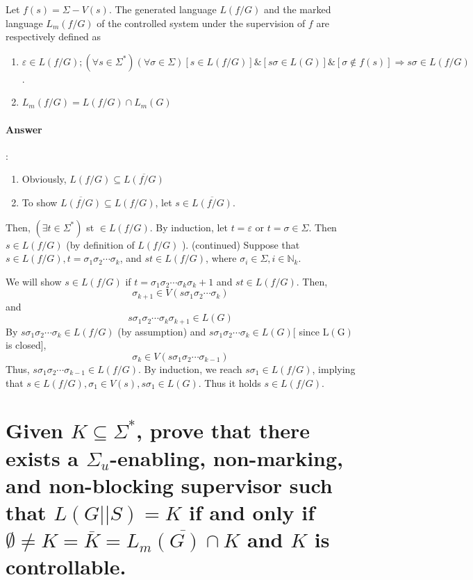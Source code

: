 \documentclass{article}
\begin{document}
Let $f(s)=\Sigma-V(s)$. The generated language $L(f / G)$ and the marked language $L_m(f / G)$ of the controlled system under the supervision of $f$ are respectively defined as
\begin{enumerate}
  \item $\varepsilon \in L(f / G) ;\left(\forall s \in \Sigma^*\right)(\forall \sigma \in \Sigma)[s \in L(f / G)] \&[s \sigma \in L(G)] \&[\sigma \notin f(s)] \Rightarrow s \sigma \in L(f / G)$.
  \item $L_m(f / G)=L(f / G) \cap L_m(G)$
\end{enumerate}

\paragraph{Answer}:
\begin{enumerate}
  \item Obviously, $L(f/ G) \subseteq \overline{L(f/ G)}$
  \item To show $\overline{L(f/ G)} \subseteq L(f/ G)$, let $s \in \overline{L(f/ G)}$.
\end{enumerate}
Then, $\left(\exists t \in \Sigma^*\right)$ st $\in L(f/ G)$.
By induction, let $t=\varepsilon$ or $t=\sigma \in \Sigma$.
Then $s \in L(f/ G)$ (by definition of $L(f/ G)$ ).
(continued) Suppose that $s \in L(f/ G), t=\sigma_1 \sigma_2 \cdots \sigma_k$, and $s t \in L(f/ G)$, where $\sigma_i \in \Sigma, i \in \mathbb{N}_k$.

We will show $s \in L(f/ G)$ if $t=\sigma_1 \sigma_2 \cdots \sigma_k \sigma_k+1$ and $s t \in L(f/ G)$. Then,
$$
\sigma_{k+1} \in V\left(s \sigma_1 \sigma_2 \cdots \sigma_k\right)
$$
and
$$
s \sigma_1 \sigma_2 \cdots \sigma_k \sigma_{k+1} \in L(G)
$$
By $s \sigma_1 \sigma_2 \cdots \sigma_k \in L(f/ G)$ (by assumption) and $s \sigma_1 \sigma_2 \cdots \sigma_k \in L(G)[$ since $\mathrm{L}(\mathrm{G})$ is closed],
$$
\sigma_k \in V\left(s \sigma_1 \sigma_2 \cdots \sigma_{k-1}\right)
$$
Thus, $s \sigma_1 \sigma_2 \cdots \sigma_{k-1} \in L(f/ G)$. By induction, we reach $s \sigma_1 \in L(f/ G)$, implying that $s \in L(f/ G), \sigma_1 \in V(s), s \sigma_1 \in L(G)$. Thus it holds $s \in L(f/ G)$.



\section{Given $K \subseteq \Sigma^*$, prove that there exists a $\Sigma_u$-enabling, non-marking, and non-blocking supervisor such that $L(G||S) = K$ if and only if $\emptyset \neq  K = \overline{K} = \overline{L_m(G) \cap K} $ and $K$ is controllable.}
\end{document}
